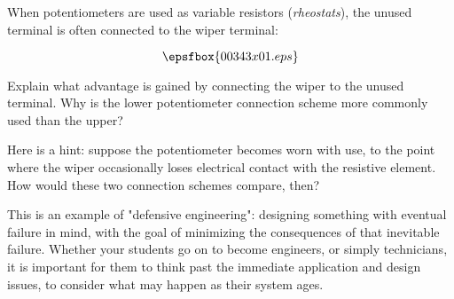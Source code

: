 

When potentiometers are used as variable resistors ({\it rheostats}), the unused terminal is often connected to the wiper terminal:

$$\epsfbox{00343x01.eps}$$

Explain what advantage is gained by connecting the wiper to the unused terminal.  Why is the lower potentiometer connection scheme more commonly used than the upper?







Here is a hint: suppose the potentiometer becomes worn with use, to the point where the wiper occasionally loses electrical contact with the resistive element.  How would these two connection schemes compare, then?







This is an example of "defensive engineering": designing something with eventual failure in mind, with the goal of minimizing the consequences of that inevitable failure.  Whether your students go on to become engineers, or simply technicians, it is important for them to think past the immediate application and design issues, to consider what may happen as their system ages.




